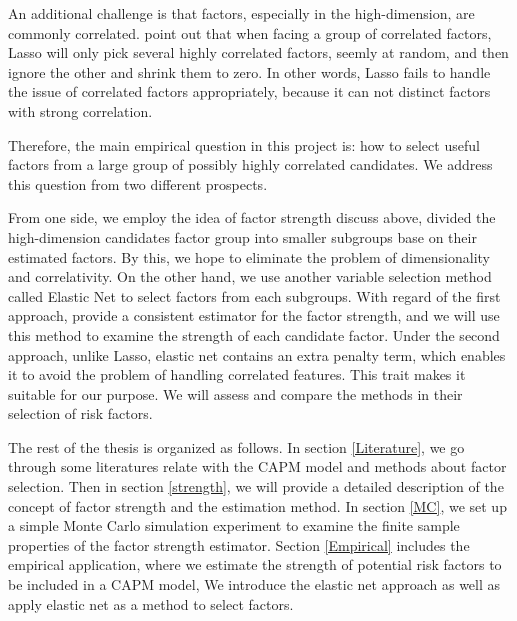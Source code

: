 An additional challenge is that factors, especially in the high-dimension, are commonly correlated.
 point out that when facing a group of correlated factors, Lasso will only pick several highly correlated factors, seemly at random, and then ignore the other and shrink them to zero. 
In other words, Lasso fails to handle the issue of correlated factors appropriately, because it can not distinct factors with strong correlation.


Therefore, the main empirical question in this project is: how to select useful factors from a large group of possibly highly correlated candidates.
We address this question from two different prospects.

From one side, we employ the idea of factor strength discuss above, divided the high-dimension candidates factor group into smaller subgroups base on their estimated factors.
By this, we hope to eliminate the problem of dimensionality and correlativity.
On the other hand, we use another variable selection method called Elastic Net \cite{Zou2005} to select factors from each subgroups.
With regard of the first approach,  provide a consistent estimator for the factor strength, and we will use this method to examine the strength of each candidate factor.
Under the second approach, unlike Lasso, elastic net contains an extra penalty term, which enables it to avoid the problem of handling correlated features.
This trait makes it suitable for our purpose.
We will assess and compare the methods in their selection of risk factors.


The rest of the thesis is organized as follows.
In section \ref{Literature}, we go through some literatures relate with the CAPM model and methods about factor selection.
Then in section \ref{strength}, we will provide a detailed description of the concept of factor strength and the estimation method.
In section \ref{MC}, we set up a simple Monte Carlo simulation experiment to examine the finite sample properties of the factor strength estimator.
Section \ref{Empirical} includes the empirical application, where we estimate the strength of potential risk factors to be included in a CAPM model, 
We introduce the elastic net approach 
as well as apply elastic net as a method to select factors.





